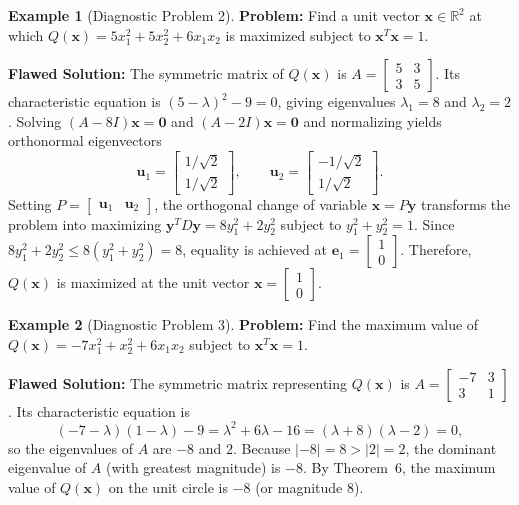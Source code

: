 \documentclass[11pt, letterpaper]{article}
\theoremstyle{definition}
\newtheorem{example}{Example}[section]
\theoremstyle{remark}
\newcommand{\R}{\mathbb{R}}
\begin{document}
\begin{example}[Diagnostic Problem 2]
\textbf{Problem:} Find a unit vector $\mathbf{x} \in \R^2$ at which $Q(\mathbf{x}) = 5x_1^2 + 5x_2^2 + 6x_1x_2$ is maximized subject to $\mathbf{x}^T \mathbf{x} = 1$.

\textbf{Flawed Solution:}
The symmetric matrix of $Q(\mathbf{x})$ is $A = \begin{bmatrix} 5 & 3 \\ 3 & 5 \end{bmatrix}$. Its characteristic equation is $(5 - \lambda)^2 - 9 = 0$, giving eigenvalues $\lambda_1 = 8$ and $\lambda_2 = 2$. Solving $(A - 8I)\mathbf{x} = \mathbf{0}$ and $(A - 2I)\mathbf{x} = \mathbf{0}$ and normalizing yields orthonormal eigenvectors
\[
\mathbf{u}_1 = \begin{bmatrix} 1/\sqrt{2} \\ 1/\sqrt{2} \end{bmatrix}, \qquad \mathbf{u}_2 = \begin{bmatrix} -1/\sqrt{2} \\ 1/\sqrt{2} \end{bmatrix}.
\]
Setting $P = \begin{bmatrix} \mathbf{u}_1 & \mathbf{u}_2 \end{bmatrix}$, the orthogonal change of variable $\mathbf{x} = P\mathbf{y}$ transforms the problem into maximizing $\mathbf{y}^T D \mathbf{y} = 8y_1^2 + 2y_2^2$ subject to $y_1^2 + y_2^2 = 1$. Since $8y_1^2 + 2y_2^2 \le 8(y_1^2 + y_2^2) = 8$, equality is achieved at $\mathbf{e}_1 = \begin{bmatrix} 1 \\ 0 \end{bmatrix}$. Therefore, $Q(\mathbf{x})$ is maximized at the unit vector $\mathbf{x} = \begin{bmatrix} 1 \\ 0 \end{bmatrix}$.
\end{example}

\begin{example}[Diagnostic Problem 3]
\textbf{Problem:} Find the maximum value of $Q(\mathbf{x}) = -7x_1^2 + x_2^2 + 6x_1x_2$ subject to $\mathbf{x}^T \mathbf{x} = 1$.

\textbf{Flawed Solution:}
The symmetric matrix representing $Q(\mathbf{x})$ is $A = \begin{bmatrix} -7 & 3 \\ 3 & 1 \end{bmatrix}$. Its characteristic equation is
\[
(-7 - \lambda)(1 - \lambda) - 9 = \lambda^2 + 6\lambda - 16 = (\lambda + 8)(\lambda - 2) = 0,
\]
so the eigenvalues of $A$ are $-8$ and $2$. Because $|-8| = 8 > |2| = 2$, the dominant eigenvalue of $A$ (with greatest magnitude) is $-8$. By Theorem~6, the maximum value of $Q(\mathbf{x})$ on the unit circle is $-8$ (or magnitude $8$).
\end{example}
\end{document}
